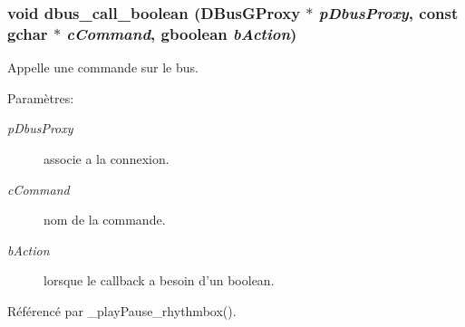 \subsubsection{\setlength{\rightskip}{0pt plus 5cm}void dbus\_\-call\_\-boolean (DBusGProxy $\ast$ {\em pDbusProxy}, \/  const gchar $\ast$ {\em cCommand}, \/  gboolean {\em bAction})}\label{cid-dbus_8h_7226d5c3c5206d7b17f93dc51e2cec10}


Appelle une commande sur le bus. \begin{Desc}
\item[Paramètres:]
\begin{description}
\item[{\em pDbusProxy}]associe a la connexion. \item[{\em cCommand}]nom de la commande. \item[{\em bAction}]lorsque le callback a besoin d'un boolean. \end{description}
\end{Desc}


Référencé par \_\-playPause\_\-rhythmbox().